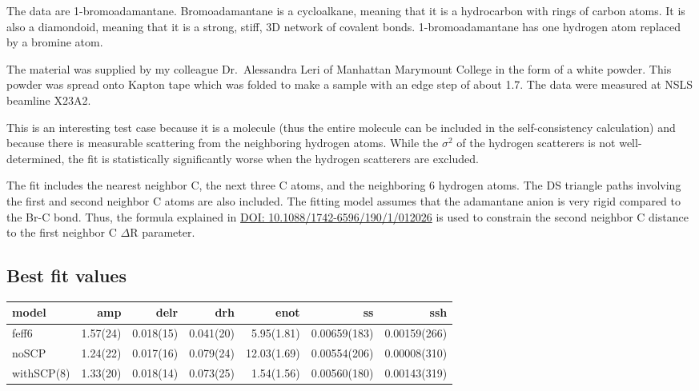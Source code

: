\documentclass[11pt]{article}
\begin{document}
The data are 1-bromoadamantane. Bromoadamantane is a cycloalkane,
meaning that it is a hydrocarbon with rings of carbon atoms. It is
also a diamondoid, meaning that it is a strong, stiff, 3D network of
covalent bonds. 1-bromoadamantane has one hydrogen atom replaced by a
bromine atom.

The material was supplied by my colleague Dr.\ Alessandra Leri of
Manhattan Marymount College in the form of a white powder. This powder
was spread onto Kapton tape which was folded to make a sample with an
edge step of about 1.7. The data were measured at NSLS beamline X23A2.

This is an interesting test case because it is a molecule (thus the
entire molecule can be included in the self-consistency calculation)
and because there is measurable scattering from the neighboring
hydrogen atoms. While the $\sigma^2$ of the hydrogen scatterers is not
well-determined, the fit is statistically significantly worse when the
hydrogen scatterers are excluded.

The fit includes the nearest neighbor C, the next three C atoms, and
the neighboring 6 hydrogen atoms. The DS triangle paths involving the
first and second neighbor C atoms are also included. The fitting model
assumes that the adamantane anion is very rigid compared to the Br-C
bond. Thus, the formula explained in
\href{http://dx.doi.org/10.1088/1742-6596/190/1/012026}{DOI:
  10.1088/1742-6596/190/1/012026} is used to constrain the second
neighbor C distance to the first neighbor C $\Delta$R parameter.

\subsection{Best fit values}
\label{sec:orgheadline32}

\begin{center}
  \begin{tabular}{lrrrrrr}
    model & amp & delr & drh & enot & ss & ssh\\
    \hline
    feff6      & 1.57(24) & 0.018(15) & 0.041(20) &  5.95(1.81) & 0.00659(183) & 0.00159(266)\\
    noSCP      & 1.24(22) & 0.017(16) & 0.079(24) & 12.03(1.69) & 0.00554(206) & 0.00008(310)\\
    withSCP(8) & 1.33(20) & 0.018(14) & 0.073(25) &  1.54(1.56) & 0.00560(180) & 0.00143(319)\\
  \end{tabular}
\end{center}
\end{document}
